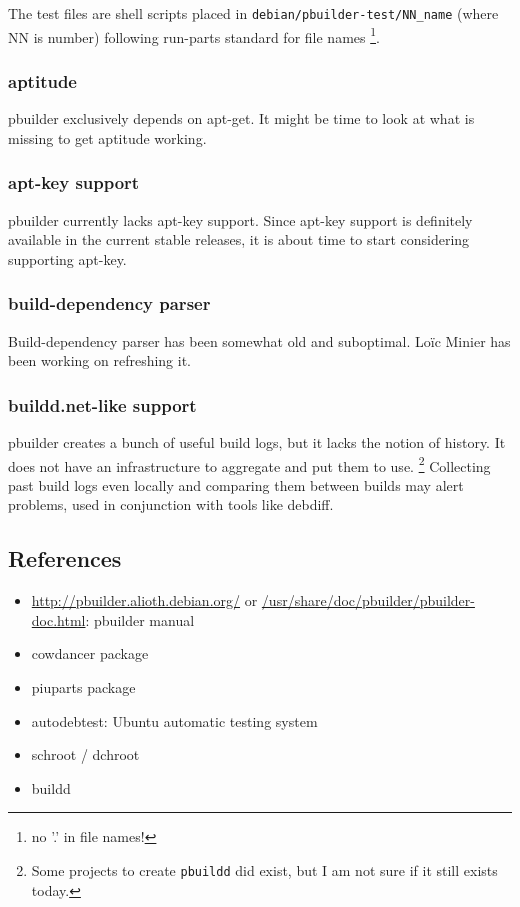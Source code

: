 \documentclass[a4paper]{article}
\begin{document}
The test files are shell scripts placed in
\verb!debian/pbuilder-test/NN_name! (where NN is number) following
run-parts standard for file names \footnote{no '.' in file names!}.

\subsubsection{aptitude}

pbuilder exclusively depends on apt-get.  It might be time to look at
what is missing to get aptitude working.

\subsubsection{apt-key support}

pbuilder currently lacks apt-key support.  Since apt-key support is
definitely available in the current stable releases, it is about time to
start considering supporting apt-key.

\subsubsection{build-dependency parser}

Build-dependency parser has been somewhat old and suboptimal.  Lo\"ic
Minier has been working on refreshing it.

\subsubsection{buildd.net-like support}

pbuilder creates a bunch of useful build logs, but it lacks the notion
of history. It does not have an infrastructure to aggregate and put them
to use.  \footnote{Some projects to create \texttt{pbuildd} did exist,
but I am not sure if it still exists today.  } Collecting past build
logs even locally and comparing them between builds may alert problems,
used in conjunction with tools like debdiff.

\subsection{References}

\begin{itemize}
 \item \url{http://pbuilder.alioth.debian.org/} or
 \url{/usr/share/doc/pbuilder/pbuilder-doc.html}: pbuilder manual
 \item cowdancer package
 \item piuparts package
 \item autodebtest: Ubuntu automatic testing system
 \item schroot / dchroot 
 \item buildd
\end{itemize}
\end{document}
